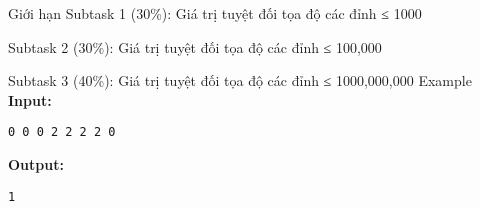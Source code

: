 Giới hạn
Subtask 1 (30\%): Giá trị tuyệt đối tọa độ các đỉnh ≤ 1000  

   Subtask 2 (30\%): Giá trị tuyệt đối tọa độ các đỉnh ≤ 100,000  

   Subtask 3 (40\%): Giá trị tuyệt đối tọa độ các đỉnh ≤ 1000,000,000
Example
\textbf{    Input:   }
\begin{verbatim}
0 0 0 2 2 2 2 0
\end{verbatim}

\textbf{    Output:   }
\begin{verbatim}
1\end{verbatim}